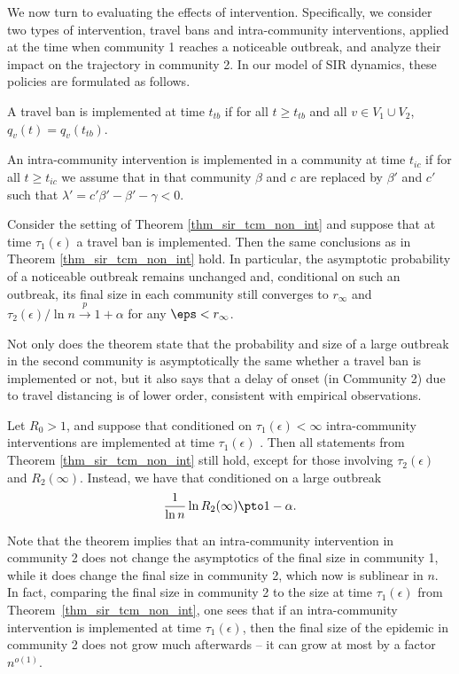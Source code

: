 \documentclass[11pt]{article}
\begin{document}
We now turn to evaluating the effects of intervention. Specifically, we consider two types of intervention, travel bans and intra-community interventions, applied at the time when community 1 reaches a noticeable outbreak, and analyze their impact on the trajectory in community 2.
In our model of SIR dynamics, these policies are formulated as follows.


\begin{definition}
    A travel ban is implemented at time $t_{tb}$ if for all $t\geq t_{tb}$ and all $v \in V_1\cup V_2$, $q_v(t) = q_v(t_{tb})$.
\end{definition}

\begin{definition}
    An intra-community intervention is implemented in a community at time $t_{ic}$ if for all $t \geq t_{ic}$ we assume that in that community $\beta$ and $c$ are replaced by $\beta'$ and $c'$ such that $\lambda' = c'\beta' - \beta' - \gamma < 0$.  
\end{definition}

\begin{theorem}\label{thm_travel_ban}
Consider the setting of Theorem \ref{thm_sir_tcm_non_int} and suppose that at time $\tau_1(\epsilon)$ a travel ban is implemented. Then the same conclusions as in Theorem \ref{thm_sir_tcm_non_int} hold. In particular, the asymptotic probability of a noticeable outbreak remains unchanged and, conditional on such an outbreak, its final size in each community still converges to $r_\infty$ and $\tau_2(\epsilon)/\ln n \overset{p}{\to} 1+\alpha$ for any $\eps < r_\infty$. 
\end{theorem}

Not only does the theorem state that the probability and size of a large outbreak in the second community is asymptotically the same whether a travel ban is implemented or not, but it also says that a delay of onset (in Community 2) due to travel distancing is of lower order, consistent with empirical observations.


\begin{theorem}\label{thm_social_distance}
Let $R_0>1$, and suppose that conditioned on $\tau_1(\epsilon)<\infty$ intra-community interventions are implemented  at time $\tau_1(\epsilon)$ . Then all statements from Theorem \ref{thm_sir_tcm_non_int} still hold, 
except for those involving $\tau_2(\epsilon)$ and $R_2(\infty)$.  Instead, we have that conditioned on a large outbreak
 \[\frac 1{\ln n}\ln R_2(\infty)\pto 1-\alpha.\]
\end{theorem}
Note that the theorem implies that an intra-community intervention in community 2 does not change the asymptotics of the final size in community 1, while it does change the final size in community 2, which now is sublinear in $n$.  In fact, comparing the final size in community 2 to the size at time $\tau_1(\epsilon)$ from Theorem~\ref{thm_sir_tcm_non_int}, one sees that if an intra-community intervention is implemented at time $\tau_1(\epsilon)$,
then the final size of the epidemic in community 2 does not grow much afterwards -- it can grow at most by a factor $n^{o(1)}$.
\end{document}
